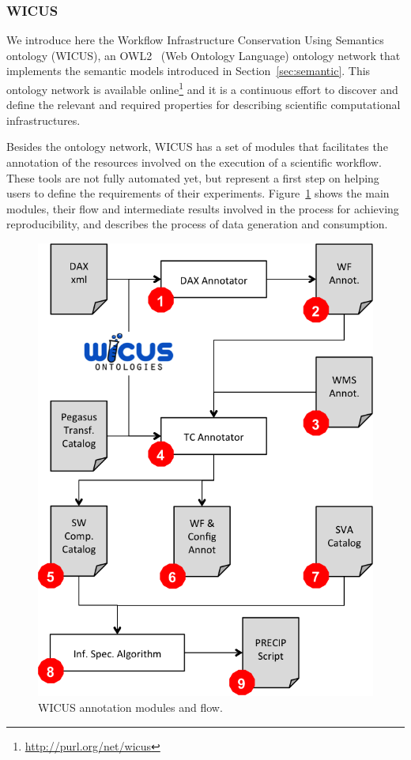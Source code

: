\subsubsection{WICUS}
We introduce here the Workflow Infrastructure Conservation Using Semantics ontology (WICUS), an OWL2~\cite{OWL2} (Web Ontology Language) ontology network that implements the semantic models introduced in Section~\ref{sec:semantic}. This ontology network is available online\footnote{\url{http://purl.org/net/wicus}} and it is a continuous effort to discover and define the relevant and required properties for describing scientific computational infrastructures. 

Besides the ontology network, WICUS has a set of modules that facilitates the annotation of the resources involved on the execution of a scientific workflow. These tools are not fully automated yet, but represent a first step on helping users to define the requirements of their experiments. Figure~\ref{fig:wicusflow} shows the main modules, their flow and intermediate results involved in the process for achieving reproducibility, and describes the process of data generation and consumption.

\begin{figure}[!htb]
	\centering
	\includegraphics[width=.8\linewidth]{figures/wicusflow}
	\caption{WICUS annotation modules and flow.}
	\label{fig:wicusflow}
\end{figure}

